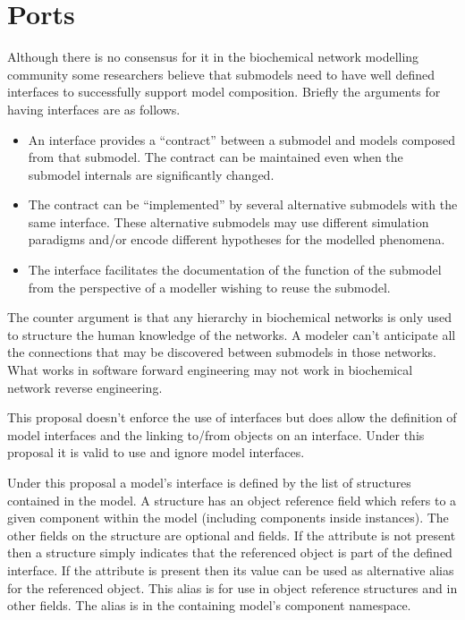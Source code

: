 \documentclass{cekarticle}
\begin{document}
\section{Ports}
\label{sec:ports}

Although there is no consensus for it in the biochemical network modelling community some researchers
believe that submodels need to have well defined interfaces to successfully support model composition.
Briefly the arguments for having interfaces are as follows.
\begin{itemize}
\item An interface provides a ``contract'' between a submodel and models composed
from that submodel.  The contract can be 
maintained even when the submodel internals are significantly changed.
\item The contract can be ``implemented'' by several alternative submodels with the same interface.  These
alternative submodels may use different simulation paradigms and/or encode different hypotheses for the modelled
phenomena. 
\item The interface facilitates the documentation of the function of the submodel from the perspective of a modeller
wishing to reuse the submodel.
\end{itemize}

The counter argument is that any hierarchy in biochemical networks is only used to structure the human knowledge
of the networks.  A modeler can't anticipate all the connections that may be discovered between submodels in those
networks.  What works in software forward engineering may not work in biochemical network reverse engineering.

This proposal doesn't enforce the use of interfaces but does allow the definition of model interfaces and
the linking to/from objects on an interface.  Under this proposal it is valid to use and ignore model interfaces.

Under this proposal a model's interface is defined by the list of  structures contained in the model.
A  structure has an object reference field which refers to a given component within the model (including
components inside instances).  The other fields on the  structure are optional  and
 fields.  If the  attribute is not present then a  structure simply indicates
that the referenced object is part of the defined interface.  If the  attribute is present then its value
can be used as alternative alias for the referenced object.  This alias is for use in object reference structures and
in other  fields.  The alias is in the containing model's component namespace.
\end{document}
